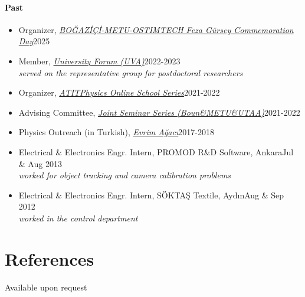 \documentclass[a4paper,11pt]{article}
\begin{document}
\paragraph{Past}
\begin{itemize}
	\item[] Organizer, \emph{\hyperref{https://ostimteknik.edu.tr/en/event/bogazici-metu-ostimtech-feza-gursey-commemoration-day-09-july-2025-6491}{}{}{BOĞAZİÇİ-METU-OSTIMTECH Feza Gürsey Commemoration Day}}\hfill 2025\hspace*{2.2em}
	\item[] Member, \emph{\hyperref{https://www.uva.nl/en/about-the-uva/policy-and-regulations/policy/university-forum/university-forum.html}{}{}{University Forum (UVA)}}\hfill 2022-2023\hspace*{2.2em}\\
	    \hspace*{1.8em}\emph{served on the representative group for postdoctoral researchers}
	\item[] Organizer, \emph{\hyperref{https://www.atitphysics.com}{}{}{ATITPhysics Online School Series}}\hfill 2021-2022\hspace*{2.2em}
	\item[] Advising Committee, \emph{\hyperref{https://sites.google.com/view/boun-metu-utaajointseminerseri/}{}{}{Joint Seminar Series (Boun\&METU\&UTAA)}}\hfill 2021-2022\hspace*{2.2em}
	\item[] Physics Outreach (in Turkish), \emph{\hyperref{https://youtube.com/playlist?list=PL48IwtBKtXrZcWuuJFpcflBkSqJv6YrW9}{}{}{Evrim Ağacı}}\hfill 2017-2018
	\item[] Electrical \& Electronics Engr. Intern, PROMOD R\&D Software, Ankara\hfill Jul \& Aug 2013\\	
	    \hspace*{1.8em}\emph{worked for object tracking and camera calibration problems}
	\item[] Electrical \& Electronics Engr. Intern, SÖKTAŞ Textile, Aydın\hfill Aug \& Sep 2012\\	
	    \hspace*{1.8em}\emph{worked in the control department}
\end{itemize}

\section{\textcolor{burntorange}{References}}
\hspace*{2em}Available upon request

\end{document}

